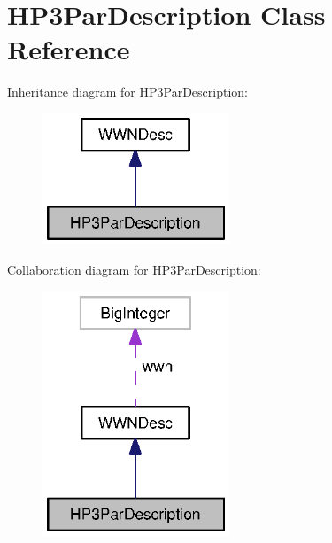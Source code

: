 \section{H\-P3\-Par\-Description Class Reference}
\label{classorg_1_1smallfoot_1_1wwn_1_1HP3ParDescription}


Inheritance diagram for H\-P3\-Par\-Description\-:\nopagebreak
\begin{figure}[H]
\begin{center}
\leavevmode
\includegraphics[width=158pt]{classorg_1_1smallfoot_1_1wwn_1_1HP3ParDescription__inherit__graph}
\end{center}
\end{figure}


Collaboration diagram for H\-P3\-Par\-Description\-:\nopagebreak
\begin{figure}[H]
\begin{center}
\leavevmode
\includegraphics[width=158pt]{classorg_1_1smallfoot_1_1wwn_1_1HP3ParDescription__coll__graph}
\end{center}
\end{figure}
